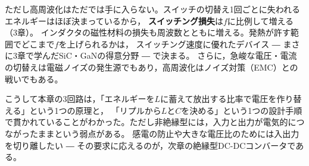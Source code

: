 ただし高周波化はただでは手に入らない。スイッチの切替え1回ごとに失われるエネルギーはほぼ決まっているから，
\textbf{スイッチング損失}は$f$に比例して増える（3章）。
インダクタの磁性材料の損失も周波数とともに増える。発熱が許す範囲でどこまで$f$を上げられるかは，
スイッチング速度に優れたデバイス ― まさに3章で学んだSiC・GaNの得意分野 ― で決まる。
さらに，急峻な電圧・電流の切替えは電磁ノイズの発生源でもあり，高周波化はノイズ対策（EMC）との戦いでもある。

こうして本章の3回路は，「エネルギーを$L$に蓄えて放出する比率で電圧を作り替える」という1つの原理と，
「リプルから$L$と$C$を決める」という1つの設計手順で貫かれていることがわかった。ただし非絶縁型には，入力と出力が電気的につながったままという弱点がある。
感電の防止や大きな電圧比のためには入出力を切り離したい ― その要求に応えるのが，次章の絶縁型DC-DCコンバータである。

\section{}
\label{sec5.9}

